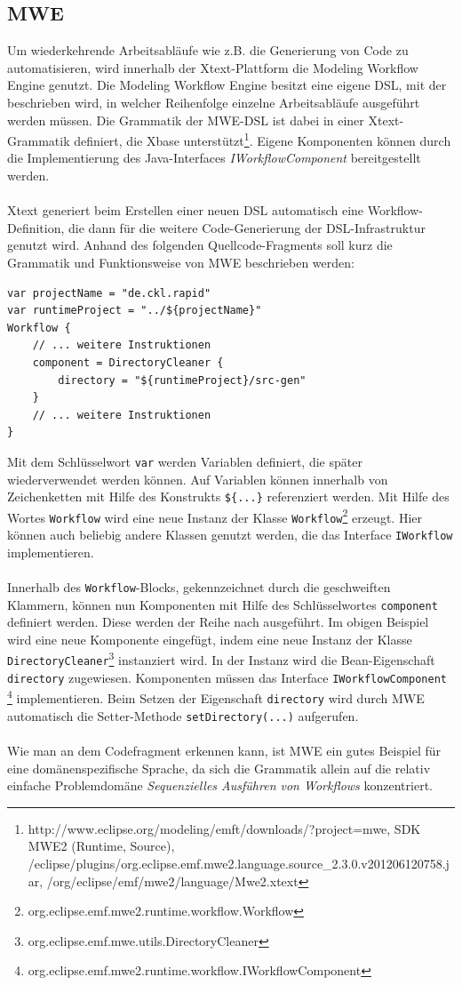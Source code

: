 \documentclass[a4paper,12pt]{scrreprt}
\begin{document}
\subsection{MWE}
Um wiederkehrende Arbeitsabläufe wie z.B. die Generierung von Code zu automatisieren, wird innerhalb der Xtext-Plattform die Modeling Workflow Engine genutzt.
Die Modeling Workflow Engine besitzt eine eigene DSL, mit der beschrieben wird, in welcher Reihenfolge einzelne Arbeitsabläufe ausgeführt werden müssen.
Die Grammatik der MWE-DSL ist dabei in einer Xtext-Grammatik definiert, die Xbase unterstützt\footnote{http://www.eclipse.org/modeling/emft/downloads/?project=mwe, SDK MWE2 (Runtime, Source), /eclipse/plugins/org.eclipse.emf.mwe2.language.source\_2.3.0.v201206120758.jar, /org/eclipse/emf/mwe2/language/Mwe2.xtext}. Eigene Komponenten können durch die Implementierung des Java-Interfaces \textit{IWorkflowComponent} bereitgestellt werden.
\\
\\
Xtext generiert beim Erstellen einer neuen DSL automatisch eine Workflow-Definition, die dann für die weitere Code-Generierung der DSL-Infrastruktur genutzt wird.
Anhand des folgenden Quellcode-Fragments soll kurz die Grammatik und Funktionsweise von MWE beschrieben werden:
\begin{verbatim}
var projectName = "de.ckl.rapid"
var runtimeProject = "../${projectName}"
Workflow {
    // ... weitere Instruktionen
    component = DirectoryCleaner {
        directory = "${runtimeProject}/src-gen"
    }
    // ... weitere Instruktionen
}
\end{verbatim}

Mit dem Schlüsselwort \texttt{var} werden Variablen definiert, die später wiederverwendet werden können. Auf Variablen können innerhalb von Zeichenketten mit Hilfe des Konstrukts \texttt{\$\{...\}} referenziert werden.
Mit Hilfe des Wortes \texttt{Workflow} wird eine neue Instanz der Klasse \texttt{Workflow}\footnote{org.eclipse.emf.mwe2.runtime.workflow.Workflow} erzeugt. Hier können auch beliebig andere Klassen genutzt werden, die das Interface \texttt{IWorkflow} implementieren.
\\
\\
Innerhalb des \texttt{Workflow}-Blocks, gekennzeichnet durch die geschweiften Klammern, können nun Komponenten mit Hilfe des Schlüsselwortes \texttt{component} definiert werden. Diese werden der Reihe nach ausgeführt. Im obigen Beispiel wird eine neue Komponente eingefügt, indem eine neue Instanz der Klasse\\
 \texttt{DirectoryCleaner}\footnote{org.eclipse.emf.mwe.utils.DirectoryCleaner} instanziert wird. In der Instanz wird die Bean-Eigenschaft \texttt{directory} zugewiesen.
Komponenten müssen das Interface \texttt{IWorkflowComponent}
\footnote{org.eclipse.emf.mwe2.runtime.workflow.IWorkflowComponent} implementieren. Beim Setzen der Eigenschaft \texttt{directory} wird durch MWE automatisch die Setter-Methode \texttt{setDirectory(...)} aufgerufen.
\\
\\
Wie man an dem Codefragment erkennen kann, ist MWE ein gutes Beispiel für eine domänenspezifische Sprache, da sich die Grammatik allein auf die relativ einfache Problemdomäne \textit{Sequenzielles Ausführen von Workflows} konzentriert.
\end{document}
